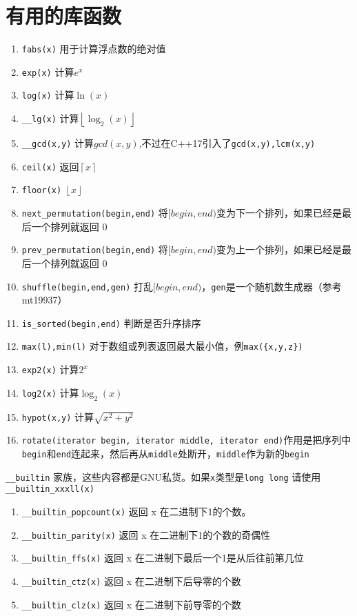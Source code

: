 \section{有用的库函数}


\begin{enumerate}
    \item \verb|fabs(x)| 用于计算浮点数的绝对值
    \item \verb|exp(x)| 计算$e^x$
    \item \verb|log(x)| 计算$\ln(x)$
    \item \verb|__lg(x)| 计算$\left \lfloor \log_2(x) \right \rfloor $
    \item \verb|__gcd(x,y)| 计算$gcd(x,y)$,不过在C++17引入了\verb|gcd(x,y),lcm(x,y)|
    \item \verb|ceil(x)| 返回$\left \lceil x \right \rceil$
    \item \verb|floor(x)| $\left \lfloor x \right \rfloor$
    \item \verb|next_permutation(begin,end)| 将$[begin,end)$变为下一个排列，如果已经是最后一个排列就返回 0
    \item \verb|prev_permutation(begin,end)| 将$[begin,end)$变为上一个排列，如果已经是最后一个排列就返回 0
    \item \verb|shuffle(begin,end,gen)| 打乱$[begin,end)$，\verb|gen|是一个随机数生成器（参考mt19937）
    \item \verb|is_sorted(begin,end)| 判断是否升序排序
    \item \verb|max(l),min(l)| 对于数组或列表返回最大最小值，例\verb|max({x,y,z})|
    \item \verb|exp2(x)| 计算$2^x$
    \item \verb|log2(x)| 计算$\log_2(x)$
    \item \verb|hypot(x,y)| 计算$\sqrt{x^2+y^2}$
    \item \verb|rotate(iterator begin, iterator middle, iterator end)|作用是把序列中\verb|begin|和\verb|end|连起来，然后再从\verb|middle|处断开，\verb|middle|作为新的\verb|begin|
\end{enumerate}

\verb|__builtin| 家族，这些内容都是GNU私货。如果\verb|x|类型是\verb|long long| 请使用\verb|__builtin_xxxll(x)|

\begin{enumerate}
    \item \verb|__builtin_popcount(x)| 返回 x 在二进制下1的个数。
    \item \verb|__builtin_parity(x)| 返回 x 在二进制下1的个数的奇偶性
    \item \verb|__builtin_ffs(x)| 返回 x 在二进制下最后一个1是从后往前第几位
    \item \verb|__builtin_ctz(x)| 返回 x 在二进制下后导零的个数
    \item \verb|__builtin_clz(x)| 返回 x 在二进制下前导零的个数
\end{enumerate}
